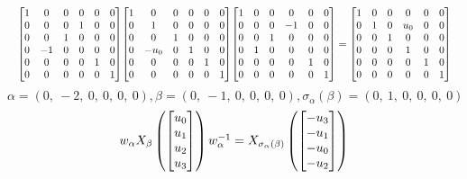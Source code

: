 \documentclass[11pt]{article}
\theoremstyle{definition}
\begin{document}
\[
\scaletoalign{\textwidth}{{\left[\begin{matrix}1 & 0 & 0 & 0 & 0 & 0\\0 & 0 & 0 & 1 & 0 & 0\\0 & 0 & 1 & 0 & 0 & 0\\0 & -1 & 0 & 0 & 0 & 0\\0 & 0 & 0 & 0 & 1 & 0\\0 & 0 & 0 & 0 & 0 & 1\end{matrix}\right]} {\left[\begin{matrix}1 & 0 & 0 & 0 & 0 & 0\\0 & 1 & 0 & 0 & 0 & 0\\0 & 0 & 1 & 0 & 0 & 0\\0 & - u_{0} & 0 & 1 & 0 & 0\\0 & 0 & 0 & 0 & 1 & 0\\0 & 0 & 0 & 0 & 0 & 1\end{matrix}\right]} {\left[\begin{matrix}1 & 0 & 0 & 0 & 0 & 0\\0 & 0 & 0 & -1 & 0 & 0\\0 & 0 & 1 & 0 & 0 & 0\\0 & 1 & 0 & 0 & 0 & 0\\0 & 0 & 0 & 0 & 1 & 0\\0 & 0 & 0 & 0 & 0 & 1\end{matrix}\right]} = {\left[\begin{matrix}1 & 0 & 0 & 0 & 0 & 0\\0 & 1 & 0 & u_{0} & 0 & 0\\0 & 0 & 1 & 0 & 0 & 0\\0 & 0 & 0 & 1 & 0 & 0\\0 & 0 & 0 & 0 & 1 & 0\\0 & 0 & 0 & 0 & 0 & 1\end{matrix}\right]}}
\]
\[
\alpha = \left( 0, \  -2, \  0, \  0, \  0, \  0\right), \beta = \left( 0, \  -1, \  0, \  0, \  0, \  0\right), \sigma_{\alpha}(\beta) = \left( 0, \  1, \  0, \  0, \  0, \  0\right)
\]
\[
\scaletoalign{\textwidth}{w_{\alpha} X_{\beta}\left(\left[\begin{matrix}u_{0}\\u_{1}\\u_{2}\\u_{3}\end{matrix}\right]\right) w_{\alpha}^{-1} = X_{\sigma_{\alpha}\left(\beta\right)}\left(\left[\begin{matrix}- u_{3}\\- u_{1}\\- u_{0}\\- u_{2}\end{matrix}\right]\right)}
\]
\end{document}
